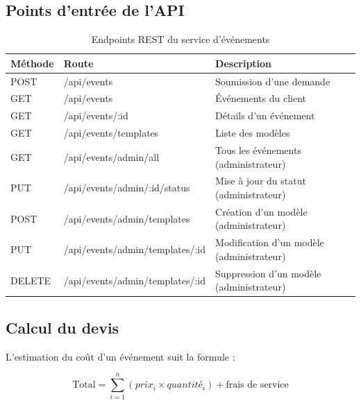 \subsection{Points d'entrée de l'API}

\begin{table}[H]
    \centering
    \caption{Endpoints REST du service d'événements}
    \label{tab:endpoints_event}
    \renewcommand{\arraystretch}{1.2}
    \begin{tabular}{|l|p{5cm}|p{4.5cm}|}
        \hline
        \textbf{Méthode} & \textbf{Route} & \textbf{Description} \\
        \hline
        POST & /api/events & Soumission d'une demande \\
        \hline
        GET & /api/events & Événements du client \\
        \hline
        GET & /api/events/:id & Détails d'un événement \\
        \hline
        GET & /api/events/templates & Liste des modèles \\
        \hline
        GET & /api/events/admin/all & Tous les événements (administrateur) \\
        \hline
        PUT & /api/events/admin/:id/status & Mise à jour du statut (administrateur) \\
        \hline
        POST & /api/events/admin/templates & Création d'un modèle (administrateur) \\
        \hline
        PUT & /api/events/admin/templates/:id & Modification d'un modèle (administrateur) \\
        \hline
        DELETE & /api/events/admin/templates/:id & Suppression d'un modèle (administrateur) \\
        \hline
    \end{tabular}
\end{table}




\subsection{Calcul du devis}

L'estimation du coût d'un événement suit la formule :

$$
\text{Total} = \sum_{i=1}^{n} (prix_i \times quantité_i) + \text{frais de service}
$$

